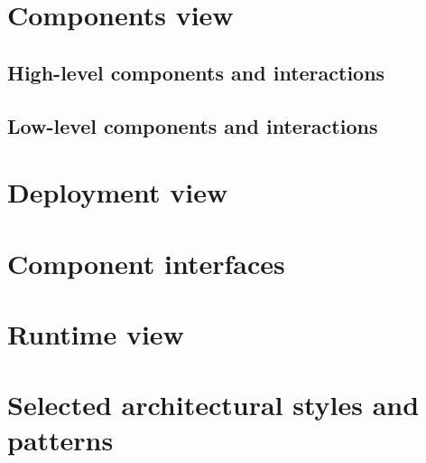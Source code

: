 \section{Components view}\label{sec:components view}
\subsection{High-level components and interactions}\label{subsec:high-level components and interactions}
\subsection{Low-level components and interactions}\label{subsec:low-level components and interactions}

\section{Deployment view}\label{sec:deployment view}


\section{Component interfaces}\label{sec:component interfaces}


\section{Runtime view}\label{sec:runtime view}


\section{Selected architectural styles and patterns}\label{sec:selected architectural styles and patterns}
